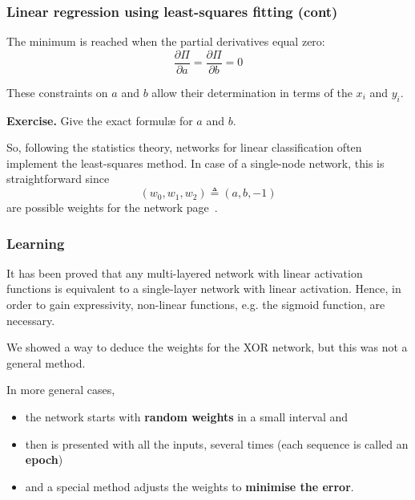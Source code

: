 %
\begin{frame}
\frametitle{Linear regression using
  least-squares fitting (cont)}

The minimum is reached when the partial derivatives equal zero:
\[
  \frac{\partial\Pi}{\partial{a}} =
  \frac{\partial\Pi}{\partial{b}} = 0
\]

\bigskip

These constraints on \(a\) and \(b\) allow their determination in
terms of the \(x_i\) and \(y_i\).

\bigskip

\textbf{Exercise.} Give the exact formul{\ae} for \(a\) and \(b\).

\bigskip

So, following the statistics theory, networks for linear
classification often implement the least-squares method. In case of a
single-node network, this is straightforward since
\[(w_0, w_1, w_2) \triangleq (a, b, -1)\]
are possible weights for the network page~\pageref{linearity}.

\end{frame}

%
\begin{frame}
\frametitle{Learning}

It has been proved that any multi-layered network with linear
activation functions is equivalent to a single-layer network with
linear activation. Hence, in order to gain expressivity, non-linear
functions, e.g. the sigmoid function, are necessary.

\bigskip

We showed a way to deduce the weights for the XOR network, but this
was not a general method.

\bigskip

In more general cases,
\begin{itemize}

  \item the network starts with \textbf{random weights} in a small
  interval and

  \item then is presented with all the inputs, several times (each
  sequence is called an \textbf{epoch})

  \item and a special method adjusts the weights to \textbf{minimise
  the error}.

\end{itemize}

\end{frame}

